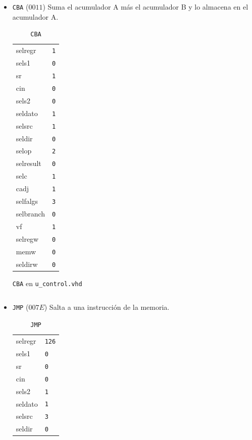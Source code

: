 \documentclass{IEEEtran}
\newenvironment{code}{\captionsetup{type=listing}}{}
\begin{document}
\begin{itemize}
\begin{code}
\inputminted[firstline=113, lastline=131]{vhdl}{../Risc/u_control.vhd}
\end{code}
\item \texttt{CBA} (\(0011\))
Suma el acumulador A más el acumulador B y lo almacena en el acumulador A.
\begin{table}[htbp]
\caption{\texttt{CBA}}
\centering
\begin{tabular}{ll}
\hline
selregr & \texttt{1}\\
sels1 & \texttt{0}\\
sr & \texttt{1}\\
cin & \texttt{0}\\
sels2 & \texttt{0}\\
seldato & \texttt{1}\\
selsrc & \texttt{1}\\
seldir & \texttt{0}\\
selop & \texttt{2}\\
selresult & \texttt{0}\\
selc & \texttt{1}\\
cadj & \texttt{1}\\
selfalgs & \texttt{3}\\
selbranch & \texttt{0}\\
vf & \texttt{1}\\
selregw & \texttt{0}\\
memw & \texttt{0}\\
seldirw & \texttt{0}\\
\hline
\end{tabular}
\end{table}
\begin{code}
\caption{\texttt{CBA} en \texttt{u\_control.vhd}}
\inputminted[firstline=233, lastline=251]{vhdl}{../Risc/u_control.vhd}
\end{code}
\item \texttt{JMP} (\(007E\))
Salta a una instrucción de la memoria.
\begin{table}[htbp]
\caption{\texttt{JMP}}
\centering
\begin{tabular}{ll}
\hline
selregr & \texttt{126}\\
sels1 & \texttt{0}\\
sr & \texttt{0}\\
cin & \texttt{0}\\
sels2 & \texttt{1}\\
seldato & \texttt{1}\\
selsrc & \texttt{3}\\
seldir & \texttt{0}\\

\end{tabular}
\end{table}
\end{itemize}
\end{document}
